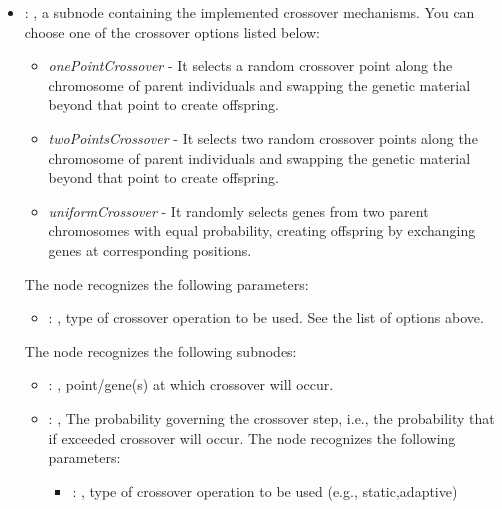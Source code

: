 \begin{itemize}
\begin{itemize}
\begin{itemize}
            \item {}: ,
              a subnode containing the implemented crossover mechanisms. You can choose one of the
              crossover options listed below:                   \begin{itemize}
              \item \textit{onePointCrossover} - It selects a random crossover point along the
              chromosome of parent individuals and swapping the genetic material beyond that point
              to create offspring.                     \item \textit{twoPointsCrossover} - It
              selects two random crossover points along the chromosome of parent individuals and
              swapping the genetic material beyond that point to create offspring.
              \item \textit{uniformCrossover} - It randomly selects genes from two parent
              chromosomes with equal probability, creating offspring by exchanging genes at
              corresponding positions.                   \end{itemize}
              The  node recognizes the following parameters:
                \begin{itemize}
                  \item {}: ,
                    type of crossover operation to be used. See the list of options above.
              \end{itemize}

              The  node recognizes the following subnodes:
              \begin{itemize}
                \item {}: ,
                  point/gene(s) at which crossover will occur.

                \item {}: ,
                  The probability governing the crossover step, i.e., the probability that if
                  exceeded crossover will occur.
                  The  node recognizes the following parameters:
                    \begin{itemize}
                      \item {}: ,
                        type of crossover operation to be used (e.g., static,adaptive)
                  \end{itemize}
              \end{itemize}


\end{itemize}
\end{itemize}
\end{itemize}
